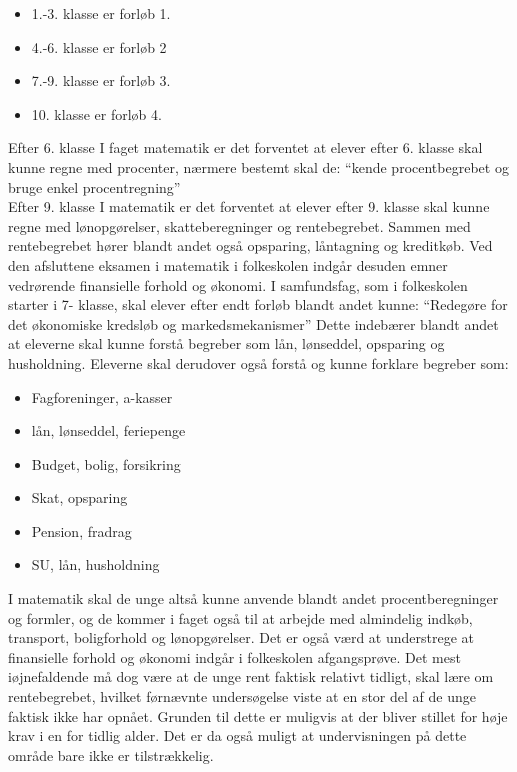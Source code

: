 \noindent \begin{itemize}
\item{1.-3. klasse er forløb 1.}
\item{4.-6. klasse er forløb 2}
\item{7.-9. klasse er forløb 3.}
\item{10. klasse er forløb 4.}\\
\end{itemize}

Efter 6. klasse
I faget matematik er det forventet at elever efter 6. klasse skal kunne regne med procenter,
nærmere bestemt skal de: “kende procentbegrebet og bruge enkel procentregning” \cite{FallesMalMatematik}\\

Efter 9. klasse
I matematik er det forventet at elever efter 9. klasse skal kunne regne med lønopgørelser, skatteberegninger og rentebegrebet.  Sammen med rentebegrebet hører blandt andet også opsparing, låntagning og kreditkøb.
Ved den afsluttene eksamen i matematik i folkeskolen indgår desuden emner vedrørende finansielle forhold og økonomi.
I samfundsfag, som i folkeskolen starter i 7- klasse, skal elever efter endt forløb blandt andet kunne: “Redegøre for det økonomiske kredsløb og markedsmekanismer” \cite{FallesMalSamfundsfag}
Dette indebærer blandt andet at eleverne skal kunne forstå begreber som lån, lønseddel, opsparing og husholdning.
Eleverne skal derudover også forstå og kunne forklare begreber som: 

\noindent \begin{itemize}
\item{Fagforeninger, a-kasser}
\item{lån, lønseddel, feriepenge}
\item{Budget, bolig, forsikring}
\item{Skat, opsparing}
\item{Pension, fradrag}
\item{SU, lån, husholdning}
\cite{FallesMalMatematik}\\
\end{itemize}

I matematik skal de unge altså kunne anvende blandt andet procentberegninger og formler, og de kommer i faget også til at arbejde med almindelig indkøb, transport, boligforhold og lønopgørelser. Det er også værd at understrege at finansielle forhold og økonomi indgår i folkeskolen afgangsprøve. Det mest iøjnefaldende må dog være at de unge rent faktisk relativt tidligt, skal lære om rentebegrebet, hvilket førnævnte undersøgelse viste at en stor del af de unge faktisk ikke har opnået. Grunden til dette er muligvis at der bliver stillet for høje krav i en for tidlig alder. Det er da også muligt at undervisningen på dette område bare ikke er tilstrækkelig.\\

